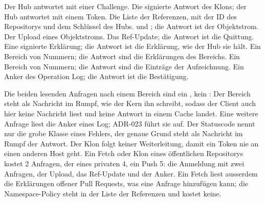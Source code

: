 \startplacetable[title={Die Anfragen eines Klons an ein Repository auf dem Hub},
reference=tab:hub-requests]
\startxtable[frame=off,option=stretch]
\startxrow[topframe=on,bottomframe=on]
 \stopxcell
{} \stopxcell
\stopxrow
\startxrow
\startxcell {} \stopxcell
\startxcell Der Hub antwortet mit einer Challenge. \stopxcell
\stopxrow
\startxrow
\startxcell {} \stopxcell
\startxcell Die signierte Antwort des Klons; der Hub antwortet mit einem Token. \stopxcell
\stopxrow
\startxrow
\startxcell {} \stopxcell
\startxcell Die Liste der Referenzen, mit der ID des Repositorys und dem Schlüssel des Hubs.
\stopxcell
\stopxrow
\startxrow
\startxcell {} \stopxcell
\startxcell {} und ; die Antwort ist der Objektstrom. \stopxcell
\stopxrow
\startxrow
\startxcell {} \stopxcell
\startxcell Der Upload eines Objektstroms. \stopxcell
\stopxrow
\startxrow
\startxcell {} \stopxcell
\startxcell Das Ref-Update; die Antwort ist die Quittung. \stopxcell
\stopxrow
\startxrow
\startxcell {} \stopxcell
\startxcell Eine signierte Erklärung; die Antwort ist die Erklärung, wie der Hub sie hält.
\stopxcell
\stopxrow
\startxrow
\startxcell {} \stopxcell
\startxcell Ein Bereich von Nummern; die Antwort sind die Erklärungen des Bereichs. \stopxcell
\stopxrow
\startxrow
\startxcell {} \stopxcell
\startxcell Ein Bereich von Nummern; die Antwort sind die Einträge der Aufzeichnung. \stopxcell
\stopxrow
\startxrow[bottomframe=on]
\startxcell {} \stopxcell
\startxcell Ein Anker des Operation Log; die Antwort ist die Bestätigung. \stopxcell
\stopxrow
\stopxtable
\stopplacetable

Die beiden lesenden Anfragen nach einem Bereich sind ein , kein :
Der Bereich steht als Nachricht im Rumpf, wie der Kern ihn schreibt, sodass der Client auch hier
keine Nachricht liest und keine Antwort in einem Cache landet.
Eine weitere Anfrage liest die Anker eines Log; ADR-023 führt sie auf.
Der Statuscode nennt nur die grobe Klasse eines Fehlers, der genaue Grund steht als Nachricht im
Rumpf der Antwort.
Der Klon folgt keiner Weiterleitung, damit ein Token nie an einen anderen Host geht.
Ein Fetch oder Klon eines öffentlichen Repositorys kostet 2 Anfragen, der eines privaten 4, ein
Push 5: die Anmeldung mit zwei Anfragen, der Upload, das Ref-Update und der Anker.
Ein Fetch liest ausserdem die Erklärungen offener Pull Requests, was eine Anfrage hinzufügen kann;
die Namespace-Policy steht in der Liste der Referenzen und kostet keine.

